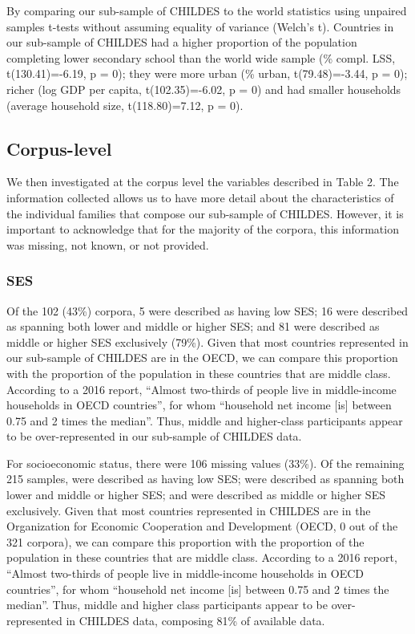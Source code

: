 \documentclass[
  man,floatsintext]{apa6}
\begin{document}
By comparing our sub-sample of CHILDES to the world statistics using unpaired samples t-tests without assuming equality of variance (Welch's t). Countries in our sub-sample of CHILDES had a higher proportion of the population completing lower secondary school than the world wide sample (\% compl. LSS, t(130.41)=-6.19, p = 0); they were more urban (\% urban, t(79.48)=-3.44, p = 0); richer (log GDP per capita, t(102.35)=-6.02, p = 0) and had smaller households (average household size, t(118.80)=7.12, p = 0).

\hypertarget{corpus-level}{%
\subsection{Corpus-level}\label{corpus-level}}

We then investigated at the corpus level the variables described in Table 2. The information collected allows us to have more detail about the characteristics of the individual families that compose our sub-sample of CHILDES. However, it is important to acknowledge that for the majority of the corpora, this information was missing, not known, or not provided.

\hypertarget{ses}{%
\subsubsection{SES}\label{ses}}

Of the 102 (43\%) corpora, 5 were described as having low SES; 16 were described as spanning both lower and middle or higher SES; and 81 were described as middle or higher SES exclusively (79\%). Given that most countries represented in our sub-sample of CHILDES are in the OECD, we can compare this proportion with the proportion of the population in these countries that are middle class. According to a 2016 report, ``Almost two-thirds of people live in middle-income households in OECD countries'', for whom ``household net income {[}is{]} between 0.75 and 2 times the median''. Thus, middle and higher-class participants appear to be over-represented in our sub-sample of CHILDES data.

For socioeconomic status, there were 106 missing values (33\%). Of the remaining 215 samples, were described as having low SES; were described as spanning both lower and middle or higher SES; and were described as middle or higher SES exclusively. Given that most countries represented in CHILDES are in the Organization for Economic Cooperation and Development (OECD, 0 out of the 321 corpora), we can compare this proportion with the proportion of the population in these countries that are middle class. According to a 2016 report, ``Almost two-thirds of people live in middle-income households in OECD countries'', for whom ``household net income {[}is{]} between 0.75 and 2 times the median''. Thus, middle and higher class participants appear to be over-represented in CHILDES data, composing 81\% of available data.
\end{document}
